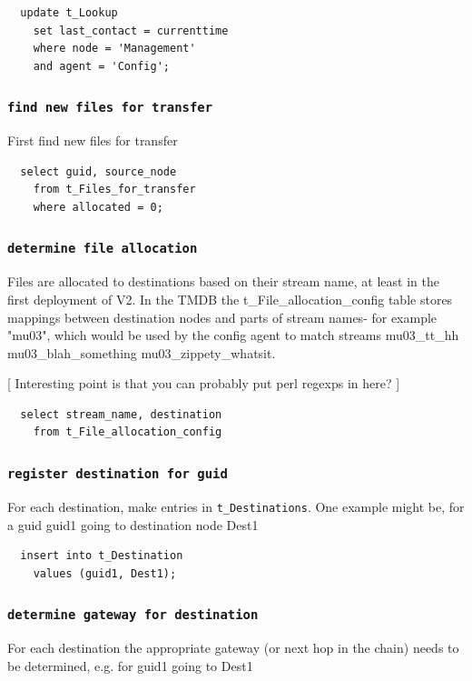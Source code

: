 \documentclass{cmspaper}
\begin{document}
{\small\begin{verbatim}
  update t_Lookup
    set last_contact = currenttime
    where node = 'Management'
    and agent = 'Config';
\end{verbatim}}

\subsubsection{\textbf{\texttt{find new files for transfer}}}
First find new files for transfer

{\small\begin{verbatim}
  select guid, source_node
    from t_Files_for_transfer
    where allocated = 0;
\end{verbatim}}

\subsubsection{\textbf{\texttt{determine file allocation}}}
Files are allocated to destinations based on their stream name, at least in the first deployment of V2. In the TMDB the t\_File\_allocation\_config table stores mappings between destination nodes and parts of stream names- for example "mu03", which would be used by the config agent to match streams mu03\_tt\_hh mu03\_blah\_something mu03\_zippety\_whatsit.

[ Interesting point is that you can probably put perl regexps in here? ]

{\small\begin{verbatim}
  select stream_name, destination
    from t_File_allocation_config
\end{verbatim}}

\subsubsection{\textbf{\texttt{register destination for guid}}}
For each destination, make entries in \texttt{t\_Destinations}. One example might be, for a guid guid1 going to destination node Dest1

{\small\begin{verbatim}
  insert into t_Destination
    values (guid1, Dest1);
\end{verbatim}}

\subsubsection{\textbf{\texttt{determine gateway for destination}}}
For each destination the appropriate gateway (or next hop in the chain) needs to be determined, e.g. for guid1 going to Dest1
\end{document}
